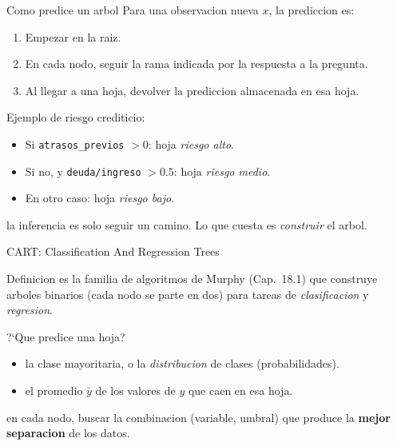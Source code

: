 \begin{frame}{Como predice un arbol}
Para una observacion nueva $x$, la prediccion es:
\begin{enumerate}\small
  \item Empezar en la raiz.
  \item En cada nodo, seguir la rama indicada por la respuesta a la pregunta.
  \item Al llegar a una hoja, devolver la prediccion almacenada en esa hoja.
\end{enumerate}

\vspace{0.3em}
Ejemplo de riesgo crediticio:
\begin{itemize}\small
  \item Si \texttt{atrasos\_previos} $> 0$: hoja \emph{riesgo alto}.
  \item Si no, y \texttt{deuda/ingreso} $> 0.5$: hoja \emph{riesgo medio}.
  \item En otro caso: hoja \emph{riesgo bajo}.
\end{itemize}

\vspace{0.3em}
 la inferencia es solo seguir un camino. Lo que cuesta es \emph{construir} el arbol.
\end{frame}

\begin{frame}{CART: Classification And Regression Trees}
\begin{block}{Definicion}
\small
{} es la familia de algoritmos de Murphy (Cap.~18.1) que construye arboles binarios (cada nodo se parte en dos) para tareas de \emph{clasificacion} y \emph{regresion}.
\end{block}

\vspace{0.3em}
?`Que predice una hoja?
\begin{itemize}\small
  \item {} la clase mayoritaria, o la \emph{distribucion} de clases (probabilidades).
  \item {} el promedio $\bar y$ de los valores de $y$ que caen en esa hoja.
\end{itemize}

\vspace{0.3em}
 en cada nodo, buscar la combinacion (variable, umbral) que produce la \textbf{mejor separacion} de los datos.
\end{frame}

